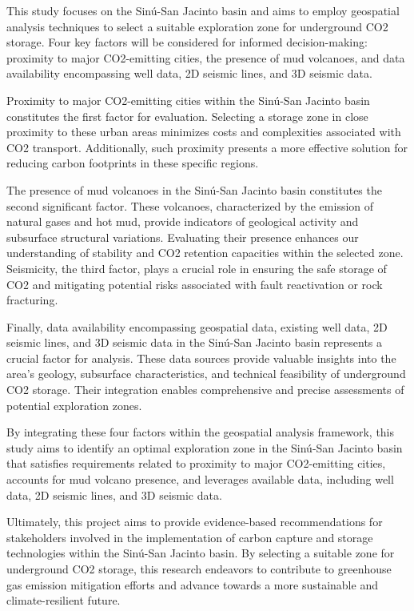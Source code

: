 \documentclass{ifacconf}
\begin{document}
This study focuses on the Sinú-San Jacinto basin and aims to employ geospatial analysis techniques to select a suitable exploration zone for underground CO2 storage\cite{Godec2014}. Four key factors will be considered for informed decision-making: proximity to major CO2-emitting cities, the presence of mud volcanoes, and data availability encompassing well data, 2D seismic lines, and 3D seismic data.

Proximity to major CO2-emitting cities within the Sinú-San Jacinto basin constitutes the first factor for evaluation. Selecting a storage zone in close proximity to these urban areas minimizes costs and complexities associated with CO2 transport. Additionally, such proximity presents a more effective solution for reducing carbon footprints in these specific regions\cite{Ajayi2019}.

The presence of mud volcanoes in the Sinú-San Jacinto basin constitutes the second significant factor. These volcanoes, characterized by the emission of natural gases and hot mud, provide indicators of geological activity and subsurface structural variations. Evaluating their presence enhances our understanding of stability and CO2 retention capacities within the selected zone.
Seismicity, the third factor, plays a crucial role in ensuring the safe storage of CO2 and mitigating potential risks associated with fault reactivation or rock fracturing.

Finally, data availability encompassing geospatial data, existing well data, 2D seismic lines, and 3D seismic data in the Sinú-San Jacinto basin represents a crucial factor for analysis. These data sources provide valuable insights into the area's geology, subsurface characteristics, and technical feasibility of underground CO2 storage. Their integration enables comprehensive and precise assessments of potential exploration zones.

By integrating these four factors within the geospatial analysis framework, this study aims to identify an optimal exploration zone in the Sinú-San Jacinto basin that satisfies requirements related to proximity to major CO2-emitting cities, accounts for mud volcano presence, and leverages available data, including well data, 2D seismic lines, and 3D seismic data.

Ultimately, this project aims to provide evidence-based recommendations for stakeholders involved in the implementation of carbon capture and storage technologies within the Sinú-San Jacinto basin. By selecting a suitable zone for underground CO2 storage, this research endeavors to contribute to greenhouse gas emission mitigation efforts and advance towards a more sustainable and climate-resilient future.
\end{document}

